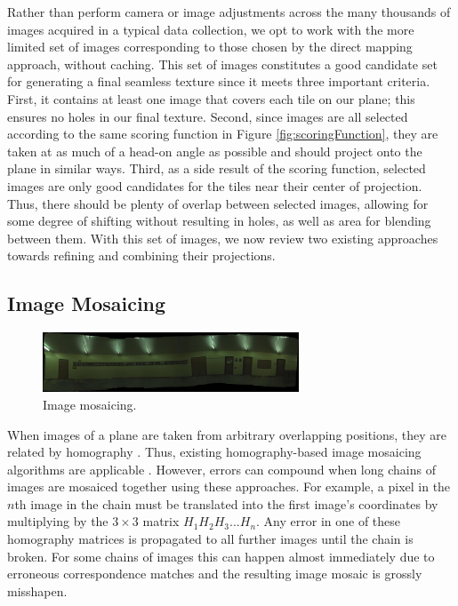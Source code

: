 \documentclass[10pt,twocolumn,letterpaper]{article}
\begin{document}
Rather than perform camera or image adjustments across the many
thousands of images acquired in a typical data collection, we opt to
work with the more limited set of images corresponding to those chosen
by the direct mapping approach, without caching. This set of images
constitutes a good candidate set for generating a final seamless
texture since it meets three important criteria. First, it contains at least one image that covers each tile on our
plane; this ensures no holes in our final texture. Second, since
images are all selected according to the same scoring function in
Figure \ref{fig:scoringFunction}, they are taken at as much of a head-on angle as possible and should project
onto the plane in similar ways. Third, as a side result of the scoring
function, selected images are only good candidates for the tiles near
their center of projection. Thus, there should be plenty of overlap
between selected images, allowing for some degree of shifting without
resulting in holes, as well as area for blending between them. With
this set of images, we now review two existing approaches towards refining and
combining their projections.

\subsection{Image Mosaicing}
\label{sec:imageMosaicing}
\begin{figure}
  \centering
  \includegraphics[width=3in]{panoMy.jpg}
  \caption{Image mosaicing. }
  \label{fig:mosaic}
\end{figure}


When images of a plane are taken from arbitrary overlapping positions,
they are related by homography \cite{hz}. Thus, existing
homography-based image mosaicing algorithms are applicable
\cite{brown2007automatic}. However, errors can compound when long
chains of images are mosaiced together using these approaches. For
example, a pixel in the $n$th image in the chain must be translated
into the first image's coordinates by multiplying by the $3\times3$
matrix $H_1 H_2 H_3 ... H_n$. Any error in one of these homography
matrices is propagated to all further images until the chain is
broken. For some chains of images this can happen almost immediately
due to erroneous correspondence matches and the resulting image mosaic
is grossly misshapen.
\end{document}
